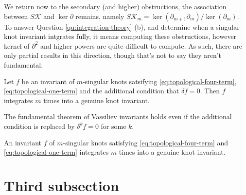 We return now to the secondary (and higher) obstructions, the association between \(S\mathcal{K}\) and \(\ker \partial\) remains, namely \(S\mathcal{K}_{m} = \ker(\partial_{m + 1} \partial_{m}) / \ker(\partial_{m})\). To answer Question \ref{qu:integration-theory} (b), and determine when a singular knot invariant intgrates fully, it means computing these obstructions, however kernel of \(\partial^{2}\) and higher powers are quite difficult to compute. As such, there are only partial results in this direction, though that's not to say they aren't fundamental.

\begin{theorem}
	\label{thm:fundamental-theorem-of-vassiliev-invariants}
	Let \(f\) be an invariant of \(m\)-singular knots satsifying \textup{\ref{eq:topological-four-term}}, \textup{\ref{eq:topological-one-term}} and the additional condition that \(\delta f = 0\). Then \(f\) integrates \(m\) times into a genuine knot invariant.
\end{theorem}

\begin{corollary}
	The fundamental theorem of Vassiliev invariants holds even if the additional condition is replaced by \(\delta^{k} f = 0\) for some \(k\).
\end{corollary}

\begin{conjecture}
	\label{conj:every-t4t-t1t-integrates}
	An invariant \(f\) of \(m\)-singular knots satisfying \textup{\ref{eq:topological-four-term}} and \textup{\ref{eq:topological-one-term}} integrates \(m\) times into a genuine knot invariant.
\end{conjecture}



\section{Third subsection}
